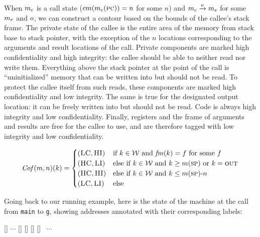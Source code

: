 \documentclass[acmsmall,review,anonymous]{acmart}\settopmatter{printfolios=true,printccs=false,printacmref=false}
\begin{document}
When \(m_c\) is a call state (\(cm(m_c(\textsc{pc})) = n\) for some $n$) and
\(m_c \xrightarrow{o} m_e\) for some
$m_e$ and $o$, we can construct a contour based on the bounds of the
callee's stack frame.
%
The private state of the callee is the entire area of the memory from
stack base to stack pointer, with the exception of the $n$ locations
corresponding to the arguments and result locations of the
call. Private components are marked high confidentiality and high
integrity: the callee should be able to neither read nor write them.
%
Everything above the stack pointer at the point of the call is
``uninitialized'' memory that can be written into but should not be
read. To protect the callee itself from such reads, these components
are marked high confidentiality and low integrity.
%
The same is true for the designated output location: it can be
freely written into but should not be read.
%
Code is always high integrity and low confidentiality.
%
Finally, registers and the frame of arguments and results are free
for the callee to use, and are therefore tagged with low integrity and
low confidentiality.

 \[\mathit{Cof}(m,n)(k) =
  \begin{cases}
    (\textsc{LC},\textsc{HI}) & \text{if } k \in {\mathcal W}
                         \text{ and } \mathit{fm}(k) = f \text{ for some }f\\
    (\textsc{HC},\textsc{LI}) & \text{else if } k \in {\mathcal W}
                          \text{ and } k \geq m(\textsc{sp})
                          \text{ or } k = \textsc{out}\\
    (\textsc{HC},\textsc{HI}) & \text{else if } k \in {\mathcal W}
                          \text{ and } k \leq m(\textsc{sp}) \textrm{-}  n \\
    (\textsc{LC},\textsc{LI}) & \text{else} \\
  \end{cases}\]

Going back to our running example, here is the state of the machine at
the call from {\tt main} to {\tt g}, showing addresses annotated with their
corresponding labels:
\vspace*{0.2em}
\begin{center}
\MemoryLabel{43.5em}{2em}{\SP}
[{\makebox[0pt]{$(\HIGHSEC,\HIGHINT)$}}]%
\hspace*{3pt}
$\cdots$
[{\makebox[0pt]{$(\HIGHSEC, \LOWINT)$}}]%
[{\makebox[0pt]{$(\HIGHSEC, \HIGHINT)$}}]%
[{\makebox[0pt]{$(\LOWSEC, \LOWINT)$}}]%
[{\makebox[0pt]{$(\HIGHSEC, \LOWINT)$}}]
~$\cdots$
\\
\end{center}
\end{document}
